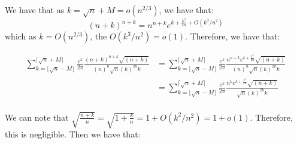 \documentclass[]{article}
\begin{document}
We have that as $k = \sqrt{n} + M = o(n^{2/3})$, we have that:
\begin{equation}
	\left(n + k\right)^{n + k} = n^{n + k} e^{k + \frac{k^2}{2n} + O(k^3/n^2)}
\end{equation}
which as $k = O(n^{2/3})$, the $O(k^3/n^2) = o(1)$. Therefore, we have that:

\begin{align*}
	\sum_{k = \lfloor \sqrt{n} - M \rfloor }^{ \lceil \sqrt{n} + M \rceil} \frac{e^{k}}{2\pi} \frac{\left(n + k\right)^{n + k}\sqrt{(n + k)}}{\left(n\right)^n \sqrt{n} \left(k\right)^{2k}k } &= 
	\sum_{k = \lfloor \sqrt{n} - M \rfloor }^{ \lceil \sqrt{n} + M \rceil} \frac{e^{k}}{2\pi} \frac{n^{n + k} e^{k + \frac{k^2}{2n}}\sqrt{(n + k)}}{\left(n\right)^n \sqrt{n} \left(k\right)^{2k}k }\\
	&=
	\sum_{k = \lfloor \sqrt{n} - M \rfloor }^{ \lceil \sqrt{n} + M \rceil}
	\frac{e^{k}}{2\pi}
	\frac{n^{k} e^{k + \frac{k^2}{2n}}\sqrt{(n + k)}}
	{\sqrt{n} \left(k\right)^{2k}k }\\
\end{align*}


We can note that $\sqrt{\frac{n + k}{n}}= \sqrt{1 + \frac{k}{n}} = 1 + O(k^2/n^2) = 1 + o(1)$. Therefore, this is negligible. Then we have that:
\end{document}
